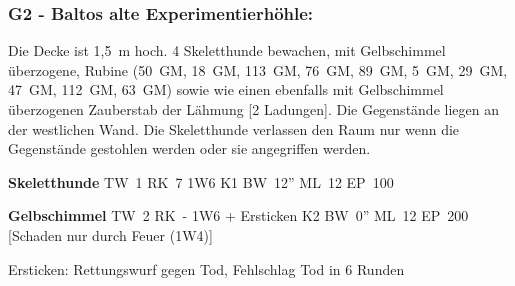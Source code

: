 \subsubsection{G2 - Baltos alte Experimentierhöhle:} Die Decke ist 1,5~m hoch. 4
Skeletthunde bewachen, mit Gelbschimmel überzogene, Rubine (50~GM, 18~GM,
113~GM, 76~GM, 89~GM, 5~GM, 29~GM, 47~GM, 112~GM, 63~GM) sowie wie einen ebenfalls
mit Gelbschimmel überzogenen Zauberstab der Lähmung [2 Ladungen]. Die
Gegenstände liegen an der westlichen Wand. Die Skeletthunde verlassen
den Raum nur wenn die Gegenstände gestohlen werden oder sie angegriffen
werden.  

\textbf{Skeletthunde} TW~1 RK~7  1W6 K1 BW~12'' ML~12 EP~100 

\textbf{Gelbschimmel} TW~2 RK~- 1W6 + Ersticken K2 BW~0'' ML~12 EP~200 [Schaden nur durch Feuer (1W4)]

Ersticken: Rettungswurf gegen Tod, Fehlschlag Tod in 6 Runden



